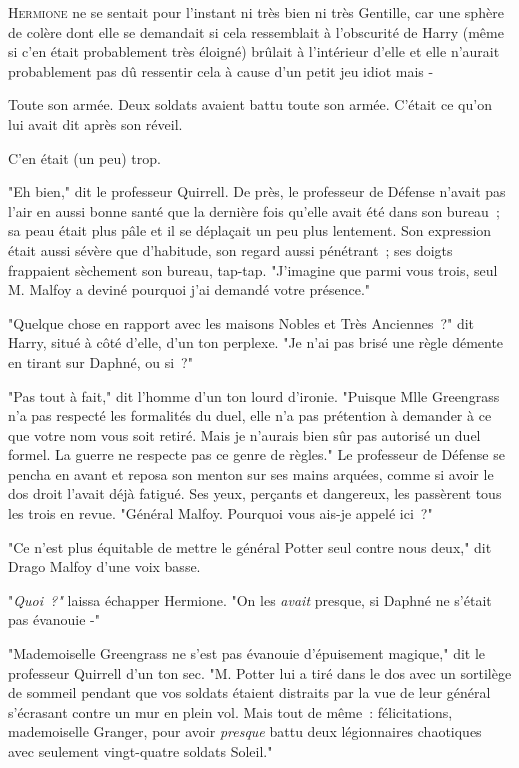 
\lettrine{H}{ermione} ne se sentait pour l'instant ni très bien ni très Gentille, car une sphère de colère dont elle se demandait si cela ressemblait à l'obscurité de Harry (même si c'en était probablement très éloigné) brûlait à l'intérieur d'elle et elle n'aurait probablement pas dû ressentir cela à cause d'un petit jeu idiot mais -

Toute son armée. Deux soldats avaient battu toute son armée. C'était ce qu'on lui avait dit après son réveil.

C'en était (un peu) trop.

"Eh bien," dit le professeur Quirrell. De près, le professeur de Défense n'avait pas l'air en aussi bonne santé que la dernière fois qu'elle avait été dans son bureau~; sa peau était plus pâle et il se déplaçait un peu plus lentement. Son expression était aussi sévère que d'habitude, son regard aussi pénétrant~; ses doigts frappaient sèchement son bureau, tap-tap. "J'imagine que parmi vous trois, seul M. Malfoy a deviné pourquoi j'ai demandé votre présence."

"Quelque chose en rapport avec les maisons Nobles et Très Anciennes~?" dit Harry, situé à côté d'elle, d'un ton perplexe. "Je n'ai pas brisé une règle démente en tirant sur Daphné, ou si~?"

"Pas tout à fait," dit l'homme d'un ton lourd d'ironie. "Puisque Mlle Greengrass n'a pas respecté les formalités du duel, elle n'a pas prétention à demander à ce que votre nom vous soit retiré. Mais je n'aurais bien sûr pas autorisé un duel formel. La guerre ne respecte pas ce genre de règles." Le professeur de Défense se pencha en avant et reposa son menton sur ses mains arquées, comme si avoir le dos droit l'avait déjà fatigué. Ses yeux, perçants et dangereux, les passèrent tous les trois en revue. "Général Malfoy. Pourquoi vous ais-je appelé ici~?"

"Ce n'est plus équitable de mettre le général Potter seul contre nous deux," dit Drago Malfoy d'une voix basse.

"\emph{Quoi~?"} laissa échapper Hermione. "On les \emph{avait} presque, si Daphné ne s'était pas évanouie -"

"Mademoiselle Greengrass ne s'est pas évanouie d'épuisement magique," dit le professeur Quirrell d'un ton sec. "M. Potter lui a tiré dans le dos avec un sortilège de sommeil pendant que vos soldats étaient distraits par la vue de leur général s'écrasant contre un mur en plein vol. Mais tout de même~: félicitations, mademoiselle Granger, pour avoir \emph{presque} battu deux légionnaires chaotiques avec seulement vingt-quatre soldats Soleil."

